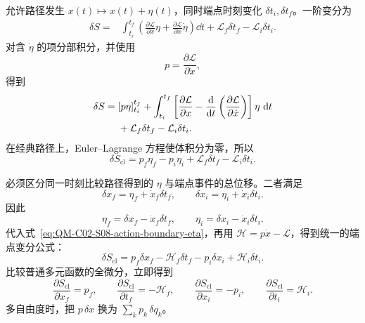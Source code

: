 允许路径发生 $x(t)\mapsto x(t)+\eta(t)$，同时端点时刻变化 $\delta t_i,\delta t_f$。一阶变分为
\begin{align}
  \delta S
  ={}&\int_{t_i}^{t_f}\left(
    \frac{\partial\mathcal L}{\partial x}\eta
    +\frac{\partial\mathcal L}{\partial\dot x}\dot\eta
  \right)\dd t
  +\mathcal L_f\delta t_f-\mathcal L_i\delta t_i.
  \label{eq:QM-C02-S08-action-moving-endpoints}
\end{align}
对含 $\dot\eta$ 的项分部积分，并使用
\[
  p=\frac{\partial\mathcal L}{\partial\dot x},
\]
得到
\begin{align}
  \delta S
  ={}&[p\eta]_{t_i}^{t_f}
  +\int_{t_i}^{t_f}\left[
    \frac{\partial\mathcal L}{\partial x}
    -\frac{\mathop{}\!\mathrm{d}}{\mathop{}\!\mathrm{d} t}
      \left(\frac{\partial\mathcal L}{\partial\dot x}\right)
  \right]\eta\,\mathop{}\!\mathrm{d} t \notag\\
  &+\mathcal L_f\delta t_f-\mathcal L_i\delta t_i.
  \label{eq:QM-C02-S08-action-integration-by-parts}
\end{align}
在经典路径上，Euler--Lagrange 方程使体积分为零，所以
\begin{equation}
  \delta S_{\mathrm{cl}}
  =p_f\eta_f-p_i\eta_i
  +\mathcal L_f\delta t_f-\mathcal L_i\delta t_i.
  \label{eq:QM-C02-S08-action-boundary-eta}
\end{equation}

必须区分同一时刻比较路径得到的 $\eta$ 与端点事件的总位移。二者满足
\begin{equation}
  \delta x_f=\eta_f+\dot x_f\delta t_f,
  \qquad
  \delta x_i=\eta_i+\dot x_i\delta t_i.
  \label{eq:QM-C02-S08-total-endpoint-shifts}
\end{equation}
因此
\[
  \eta_f=\delta x_f-\dot x_f\delta t_f,
  \qquad
  \eta_i=\delta x_i-\dot x_i\delta t_i.
\]
代入式~\eqref{eq:QM-C02-S08-action-boundary-eta}，再用 $\mathcal H=p\dot x-\mathcal L$，得到统一的端点变分公式：
\begin{equation}
  \boxed{
  \delta S_{\mathrm{cl}}
  =p_f\delta x_f-\mathcal H_f\delta t_f
  -p_i\delta x_i+\mathcal H_i\delta t_i.}
  \label{eq:QM-C02-S08-action-endpoint-differential}
\end{equation}
比较普通多元函数的全微分，立即得到
\begin{equation}
  \boxed{
  \frac{\partial S_{\mathrm{cl}}}{\partial x_f}=p_f,
  \qquad
  \frac{\partial S_{\mathrm{cl}}}{\partial t_f}=-\mathcal H_f,
  \qquad
  \frac{\partial S_{\mathrm{cl}}}{\partial x_i}=-p_i,
  \qquad
  \frac{\partial S_{\mathrm{cl}}}{\partial t_i}=\mathcal H_i.}
  \label{eq:QM-C02-S08-action-endpoint-derivatives}
\end{equation}
多自由度时，把 $p\,\delta x$ 换为 $\sum_kp_k\,\delta q_k$。

